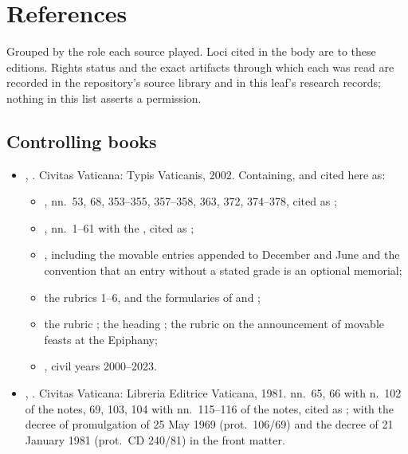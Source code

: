 \section{References}

Grouped by the role each source played. Loci cited in the body are to these editions. Rights status
and the exact artifacts through which each was read are recorded in the repository's source library
and in this leaf's research records; nothing in this list asserts a permission.

\subsection{Controlling books}

\begin{itemize}
\item {}, . Civitas Vaticana: Typis Vaticanis, 2002. Containing, and cited here as:
  \begin{itemize}
  \item {}, nn.~53, 68, 353--355, 357--358, 363, 372,
  374--378, cited as ;
  \item {}, nn.~1--61 with the
  , cited as ;
  \item {}, including the movable entries appended to December and
  June and the convention that an entry without a stated grade is an optional memorial;
  \item the rubrics  1--6, and the formularies of
   and ;
  \item the rubric ; the heading ;
  the rubric on the announcement of movable feasts at the Epiphany;
  \item {}, civil years 2000--2023.
  \end{itemize}
\item {}, . Civitas Vaticana: Libreria
Editrice Vaticana, 1981.  nn.~65, 66 with n.~102 of the notes, 69, 103, 104 with
nn.~115--116 of the notes, cited as ; with the decree of promulgation of 25 May 1969
(prot.\ 106/69) and the decree  of 21 January 1981
(prot.\ CD 240/81) in the front matter.
\end{itemize}

